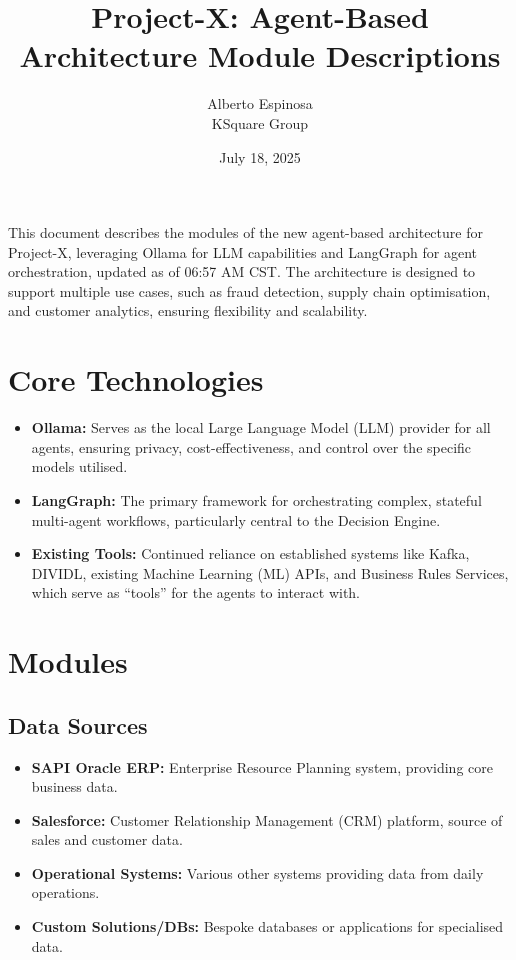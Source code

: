 \documentclass{article}
\title{Project-X: Agent-Based Architecture Module Descriptions}
\author{Alberto Espinosa\\
KSquare Group}
\date{July 18, 2025}
\begin{document}
\maketitle

This document describes the modules of the new agent-based architecture for Project-X, leveraging Ollama for LLM capabilities and LangGraph for agent orchestration, updated as of 06:57 AM CST. The architecture is designed to support multiple use cases, such as fraud detection, supply chain optimisation, and customer analytics, ensuring flexibility and scalability.

\section{Core Technologies}
\begin{itemize}
    \item \textbf{Ollama:} Serves as the local Large Language Model (LLM) provider for all agents, ensuring privacy, cost-effectiveness, and control over the specific models utilised.
    \item \textbf{LangGraph:} The primary framework for orchestrating complex, stateful multi-agent workflows, particularly central to the Decision Engine.
    \item \textbf{Existing Tools:} Continued reliance on established systems like Kafka, DIVIDL, existing Machine Learning (ML) APIs, and Business Rules Services, which serve as ``tools'' for the agents to interact with.
\end{itemize}

\section{Modules}

\subsection{Data Sources}
\begin{itemize}
    \item \textbf{SAPI Oracle ERP:} Enterprise Resource Planning system, providing core business data.
    \item \textbf{Salesforce:} Customer Relationship Management (CRM) platform, source of sales and customer data.
    \item \textbf{Operational Systems:} Various other systems providing data from daily operations.
    \item \textbf{Custom Solutions/DBs:} Bespoke databases or applications for specialised data.
\end{itemize}
\end{document}
